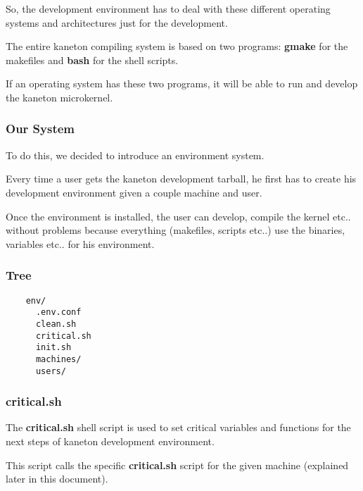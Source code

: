 {\begin{frame}
  \nl

  So, the development environment has to deal with these different operating
  systems and architectures just for the development.

  \nl

  The entire kaneton compiling system is based on two programs:
  \textbf{gmake} for the makefiles and \textbf{bash} for the shell scripts.

  \nl

  If an operating system has these two programs, it will be able to run
  and develop the kaneton microkernel.
\end{frame}


\begin{frame}
  \frametitle{Our System}

  To do this, we decided to introduce an environment system.

  \nl

  Every time a user gets the kaneton development tarball, he first has to
  create his development environment given a couple machine and user.

  \nl

  Once the environment is installed, the user can develop, compile the kernel
  etc.. without problems because everything (makefiles, scripts etc..) use
  the binaries, variables etc.. for his environment.
\end{frame}


\begin{frame}[containsverbatim]
  \frametitle{Tree}

  \begin{verbatim}
    env/
      .env.conf
      clean.sh
      critical.sh
      init.sh
      machines/
      users/
  \end{verbatim}
\end{frame}


\begin{frame}
  \frametitle{critical.sh}

  The \textbf{critical.sh} shell script is used to set critical variables and
  functions for the next steps of kaneton development environment.

  \nl

  This script calls the specific \textbf{critical.sh} script for the given
  machine (explained later in this document).

\end{frame}

}
